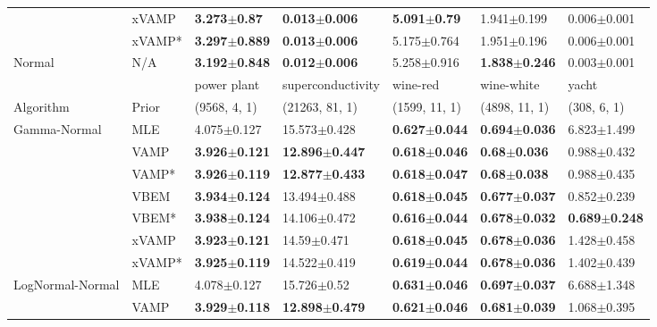 \begin{tabular}{lllllll}
       & xVAMP &   \textbf{3.273$\pm$0.87} &  \textbf{0.013$\pm$0.006} &   \textbf{5.091$\pm$0.79} &           1.941$\pm$0.199 &         0.006$\pm$0.001 \\
       & xVAMP* &  \textbf{3.297$\pm$0.889} &  \textbf{0.013$\pm$0.006} &           5.175$\pm$0.764 &           1.951$\pm$0.196 &         0.006$\pm$0.001 \\
Normal & N/A &  \textbf{3.192$\pm$0.848} &  \textbf{0.012$\pm$0.006} &           5.258$\pm$0.916 &  \textbf{1.838$\pm$0.246} &         0.003$\pm$0.001 \\
\midrule
       &     &               power plant &          superconductivity &                  wine-red &                wine-white &                     yacht \\
Algorithm & Prior& (9568, 4, 1)& (21263, 81, 1)& (1599, 11, 1)& (4898, 11, 1)& (308, 6, 1)\\
\midrule
Gamma-Normal & MLE &           4.075$\pm$0.127 &           15.573$\pm$0.428 &  \textbf{0.627$\pm$0.044} &  \textbf{0.694$\pm$0.036} &           6.823$\pm$1.499 \\
       & VAMP &  \textbf{3.926$\pm$0.121} &  \textbf{12.896$\pm$0.447} &  \textbf{0.618$\pm$0.046} &   \textbf{0.68$\pm$0.036} &           0.988$\pm$0.432 \\
       & VAMP* &  \textbf{3.926$\pm$0.119} &  \textbf{12.877$\pm$0.433} &  \textbf{0.618$\pm$0.047} &   \textbf{0.68$\pm$0.038} &           0.988$\pm$0.435 \\
       & VBEM &  \textbf{3.934$\pm$0.124} &           13.494$\pm$0.488 &  \textbf{0.618$\pm$0.045} &  \textbf{0.677$\pm$0.037} &           0.852$\pm$0.239 \\
       & VBEM* &  \textbf{3.938$\pm$0.124} &           14.106$\pm$0.472 &  \textbf{0.616$\pm$0.044} &  \textbf{0.678$\pm$0.032} &  \textbf{0.689$\pm$0.248} \\
       & xVAMP &  \textbf{3.923$\pm$0.121} &            14.59$\pm$0.471 &  \textbf{0.618$\pm$0.045} &  \textbf{0.678$\pm$0.036} &           1.428$\pm$0.458 \\
       & xVAMP* &  \textbf{3.925$\pm$0.119} &           14.522$\pm$0.419 &  \textbf{0.619$\pm$0.044} &  \textbf{0.678$\pm$0.036} &           1.402$\pm$0.439 \\
LogNormal-Normal & MLE &           4.078$\pm$0.127 &            15.726$\pm$0.52 &  \textbf{0.631$\pm$0.046} &  \textbf{0.697$\pm$0.037} &           6.688$\pm$1.348 \\
       & VAMP &  \textbf{3.929$\pm$0.118} &  \textbf{12.898$\pm$0.479} &  \textbf{0.621$\pm$0.046} &  \textbf{0.681$\pm$0.039} &           1.068$\pm$0.395 \\

\end{tabular}
